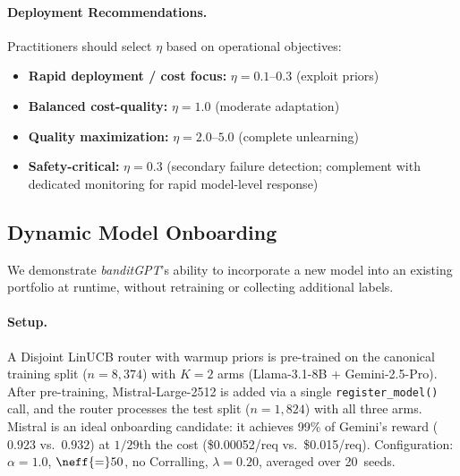 \paragraph{Deployment Recommendations.}
Practitioners should select $\eta$ based on operational objectives:
\begin{itemize}[nosep]
    \item \textbf{Rapid deployment / cost focus:} $\eta=0.1$--$0.3$ (exploit priors)
    \item \textbf{Balanced cost-quality:} $\eta=1.0$ (moderate adaptation)
    \item \textbf{Quality maximization:} $\eta=2.0$--$5.0$ (complete unlearning)
    \item \textbf{Safety-critical:} $\eta=0.3$ (secondary failure detection; complement with dedicated monitoring for rapid model-level response)
\end{itemize}



\subsection{Dynamic Model Onboarding}
\label{app:model_onboarding_figure}

We demonstrate \textit{banditGPT}'s ability to incorporate a new model
into an existing portfolio at runtime, without retraining or collecting
additional labels.

\paragraph{Setup.}
A Disjoint LinUCB router with warmup priors is pre-trained on the
canonical training split ($n{=}8{,}374$) with $K{=}2$ arms
(Llama-3.1-8B + Gemini-2.5-Pro).
After pre-training, Mistral-Large-2512 is added via a single
\texttt{register\_model()} call, and the router processes the test split
($n{=}1{,}824$) with all three arms.
Mistral is an ideal onboarding candidate: it achieves 99\% of Gemini's
reward ($0.923$ vs.\ $0.932$) at $1/29$th the cost
(\$0.00052/req vs.\ \$0.015/req).
Configuration: $\alpha{=}1.0$, $\neff{=}50$, no Corralling,
$\lambda{=}0.20$, averaged over 20~seeds.

